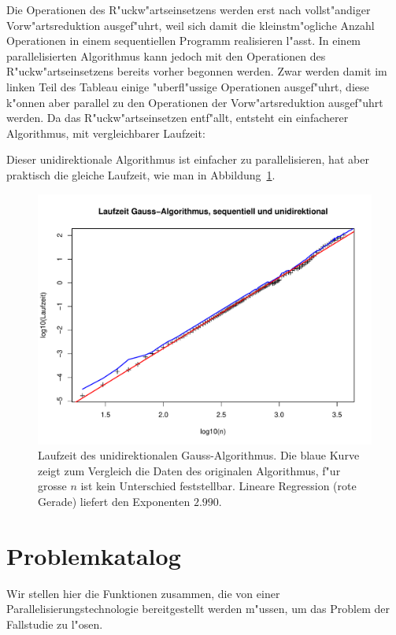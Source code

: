 Die Operationen des R"uckw"artseinsetzens werden erst nach vollst"andiger
Vorw"artsreduktion ausgef"uhrt, weil sich damit die kleinstm"ogliche
Anzahl Operationen in einem sequentiellen Programm realisieren l"asst.
In einem parallelisierten Algorithmus kann jedoch mit den Operationen
des R"uckw"artseinsetzens bereits vorher begonnen werden. Zwar werden damit
im linken Teil des Tableau einige "uberfl"ussige Operationen ausgef"uhrt,
diese k"onnen aber parallel zu den Operationen der Vorw"artsreduktion
ausgef"uhrt werden.
Da das R"uckw"arts\-einsetzen entf"allt, entsteht ein einfacherer Algorithmus,
mit vergleichbarer Laufzeit:

Dieser unidirektionale Algorithmus ist einfacher zu parallelisieren, hat
aber praktisch die gleiche Laufzeit, wie man in Abbildung~\ref{gauss-uni}.
\begin{figure}
\begin{center}
\includegraphics[width=\hsize]{images/gauss-uni.pdf}
\end{center}
\caption{Laufzeit des unidirektionalen Gauss-Algorithmus. Die blaue Kurve
zeigt zum Vergleich die Daten des originalen Algorithmus, f"ur grosse
$n$ ist kein Unterschied feststellbar.
Lineare Regression (rote Gerade) liefert den Exponenten $2.990$.
\label{gauss-uni}}
\end{figure}

\section{Problemkatalog}
Wir stellen hier die Funktionen zusammen, die von einer
Parallelisierungstechnologie bereitgestellt werden m"ussen, um das Problem
der Fallstudie zu l"osen.

